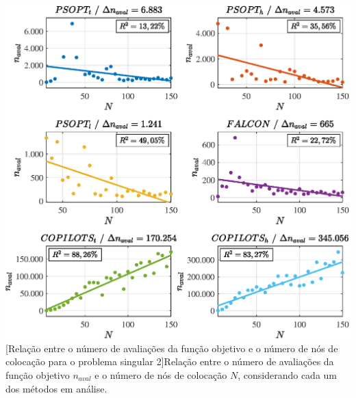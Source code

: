 \noindent
\begin{minipage}{\textwidth}
	\vspace{\onelineskip}
	\centering
	\includegraphics[scale=0.70]{fig/resultados/singular2/sens/eval}
	[Relação entre o número de avaliações da função objetivo e o número de nós de colocação para o problema singular 2]{Relação entre o número de avaliações da função objetivo $ n_{aval} $ e o número de nós de colocação $ N $, considerando cada um dos métodos em análise.}
	\label{fig:singular2:sensibilidade:naval}
	\vspace{\onelineskip}
\end{minipage}


